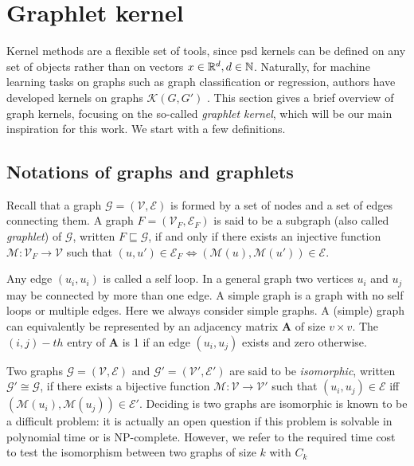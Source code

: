 \section{Graphlet kernel}
Kernel methods are a flexible set of tools, since psd kernels can be defined on any set of objects rather than on vectors $x\in \mathbb{R}^d, d\in \mathbb{N}$. Naturally, for machine learning tasks on graphs such as graph classification or regression, authors have developed kernels on graphs $\mathcal{K}(G,G')$ \citep{kriege_graph_kernels}. This section gives a brief overview of graph kernels, focusing on the so-called \emph{graphlet kernel}, which will be our main inspiration for this work. We start with a few definitions.
\subsection{Notations of graphs and graphlets}
Recall that a graph $\mathcal{G} = (\mathcal{V}, \mathcal{E})$ is formed by a set of nodes and a set of edges connecting them. A graph $F=(\mathcal{V}_F,\mathcal{E}_F)$ is said to be a subgraph (also called \emph{graphlet}) of $\mathcal{G}$, written $F\sqsubseteq \mathcal{G}$, if and only if there exists an injective function $\mathcal{M}:\mathcal{V}_F\xrightarrow{} \mathcal{V}$ such that $(u,u')\in \mathcal{E}_F \Leftrightarrow{(\mathcal{M}(u),\mathcal{M}(u'))\in \mathcal{E}}$.

Any edge $(u_i, u_i)$ is called a self loop. In a general graph two vertices $u_i$ and $u_j$ may be connected by more than
one edge. A simple graph is a graph with no self loops or multiple edges. Here we always consider simple graphs.
A (simple) graph can equivalently be represented by an adjacency matrix $\mathbf{A}$ of size $v \times v$. The $(i,j)-th$ entry of $\mathbf{A}$ is 1 if an edge $(u_i, u_j)$ exists and zero otherwise.

Two graphs $\mathcal{G}=(\mathcal{V},\mathcal{E})$ and $\mathcal{G'}=(\mathcal{V'},\mathcal{E'})$ are said to be \emph{isomorphic}, written $\mathcal{G}'\cong \mathcal{G}$, if there exists a bijective function $\mathcal{M}:\mathcal{V}\xrightarrow{} \mathcal{V}'$ such that $(u_i,u_j)\in \mathcal{E}$ iff $(\mathcal{M}(u_i),\mathcal{M}(u_j))\in \mathcal{E}'$. Deciding is two graphs are isomorphic is known to be a difficult problem: it is actually an open question if this problem is solvable in polynomial time or is NP-complete. However, we refer to the required time cost to test the isomorphism between two graphs of size $k$ with $C_k$


